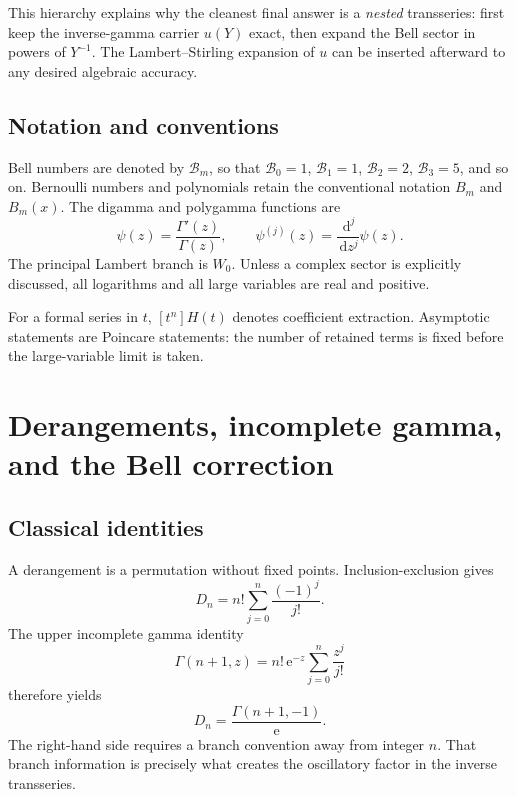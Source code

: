\documentclass[11pt]{article}
\numberwithin{equation}{section}
\theoremstyle{mainthm}
\theoremstyle{defstyle}
\theoremstyle{remark}
\newcommand{\e}{\mathrm e}
\newcommand{\dd}{\,\mathrm d}
\newcommand{\Bell}{\mathcal B}
\begin{document}
This hierarchy explains why the cleanest final answer is a \emph{nested} transseries: first keep the inverse-gamma carrier \(u(Y)\) exact, then expand the Bell sector in powers of \(Y^{-1}\).  The Lambert--Stirling expansion of \(u\) can be inserted afterward to any desired algebraic accuracy.

\subsection{Notation and conventions}

Bell numbers are denoted by \(\Bell_m\), so that \(\Bell_0=1\), \(\Bell_1=1\), \(\Bell_2=2\), \(\Bell_3=5\), and so on.  Bernoulli numbers and polynomials retain the conventional notation \(B_m\) and \(B_m(x)\).  The digamma and polygamma functions are
\[
 \psi(z)=\frac{\Gamma'(z)}{\Gamma(z)},
 \qquad \psi^{(j)}(z)=\frac{\dd^j}{\dd z^j}\psi(z).
\]
The principal Lambert branch is \(W_0\).  Unless a complex sector is explicitly discussed, all logarithms and all large variables are real and positive.

For a formal series in \(t\), \([t^n]H(t)\) denotes coefficient extraction.  Asymptotic statements are Poincare statements: the number of retained terms is fixed before the large-variable limit is taken.

\section{Derangements, incomplete gamma, and the Bell correction}

\subsection{Classical identities}

A derangement is a permutation without fixed points.  Inclusion-exclusion gives
\begin{equation}\label{eq:derangement-finite-sum}
 D_n=n!\sum_{j=0}^{n}\frac{(-1)^j}{j!}.
\end{equation}
The upper incomplete gamma identity
\[
 \Gamma(n+1,z)=n!\,\e^{-z}\sum_{j=0}^{n}\frac{z^j}{j!}
\]
therefore yields
\begin{equation}\label{eq:integer-incomplete-gamma}
 D_n=\frac{\Gamma(n+1,-1)}{\e}.
\end{equation}
The right-hand side requires a branch convention away from integer \(n\).  That branch information is precisely what creates the oscillatory factor in the inverse transseries.
\end{document}
